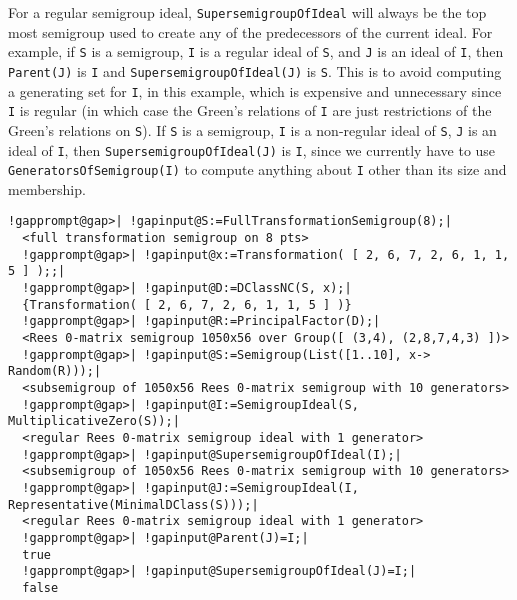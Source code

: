 \documentclass[a4paper,11pt]{report}
\begin{document}
{{{ For a regular semigroup ideal, \texttt{SupersemigroupOfIdeal} will always be the top most semigroup used to create any of the predecessors
of the current ideal. For example, if \texttt{S} is a semigroup, \texttt{I} is a regular ideal of \texttt{S}, and \texttt{J} is an ideal of \texttt{I}, then \texttt{Parent(J)} is \texttt{I} and \texttt{SupersemigroupOfIdeal(J)} is \texttt{S}. This is to avoid computing a generating set for \texttt{I}, in this example, which is expensive and unnecessary since \texttt{I} is regular (in which case the Green's relations of \texttt{I} are just restrictions of the Green's relations on \texttt{S}). If \texttt{S} is a semigroup, \texttt{I} is a non-regular ideal of \texttt{S}, \texttt{J} is an ideal of \texttt{I}, then \texttt{SupersemigroupOfIdeal(J)} is \texttt{I}, since we currently have to use \texttt{GeneratorsOfSemigroup(I)} to compute anything about \texttt{I} other than its size and membership. 
\begin{Verbatim}[commandchars=!@|,fontsize=\small,frame=single,label=Example]
  !gapprompt@gap>| !gapinput@S:=FullTransformationSemigroup(8);|
  <full transformation semigroup on 8 pts>
  !gapprompt@gap>| !gapinput@x:=Transformation( [ 2, 6, 7, 2, 6, 1, 1, 5 ] );;|
  !gapprompt@gap>| !gapinput@D:=DClassNC(S, x);|
  {Transformation( [ 2, 6, 7, 2, 6, 1, 1, 5 ] )}
  !gapprompt@gap>| !gapinput@R:=PrincipalFactor(D);|
  <Rees 0-matrix semigroup 1050x56 over Group([ (3,4), (2,8,7,4,3) ])>
  !gapprompt@gap>| !gapinput@S:=Semigroup(List([1..10], x-> Random(R)));|
  <subsemigroup of 1050x56 Rees 0-matrix semigroup with 10 generators>
  !gapprompt@gap>| !gapinput@I:=SemigroupIdeal(S, MultiplicativeZero(S));|
  <regular Rees 0-matrix semigroup ideal with 1 generator>
  !gapprompt@gap>| !gapinput@SupersemigroupOfIdeal(I);|
  <subsemigroup of 1050x56 Rees 0-matrix semigroup with 10 generators>
  !gapprompt@gap>| !gapinput@J:=SemigroupIdeal(I, Representative(MinimalDClass(S)));|
  <regular Rees 0-matrix semigroup ideal with 1 generator>
  !gapprompt@gap>| !gapinput@Parent(J)=I;|
  true
  !gapprompt@gap>| !gapinput@SupersemigroupOfIdeal(J)=I;|
  false
\end{Verbatim}
 }

 }

 }

  
\end{document}
